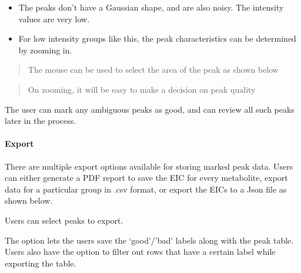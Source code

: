 \documentclass[letterpaper,10pt,english,openany,oneside]{sphinxmanual}
\begin{document}
\begin{itemize}
\item {} 
The peaks don’t have a Gaussian shape, and are also noisy. The intensity values are very low.

\end{itemize}

\begin{itemize}
\item {} 
For low intensity groups like this, the peak characteristics can be determined by zooming in.

\end{itemize}

\begin{quote}

The mouse can be used to select the area of the peak as shown below
\end{quote}

\begin{quote}

On zooming, it will be easy to make a decision on peak quality
\end{quote}


The user can mark any ambiguous peaks as good, and can review all such peaks later in the process.


\paragraph{Export}
\label{\detokenize{UnlabeledLCMSWorkflow:export}}
There are multiple export options available for storing marked peak data. Users can either generate a PDF report to save the EIC for every metabolite, export data for a particular group in .csv format, or export the EICs to a Json file as shown below.


Users can select  peaks to export.


The  option  lets the users save the ‘good’/’bad’ labels along with the peak table. Users also have the option to filter out rows that have a certain label while exporting the table.
\end{document}
